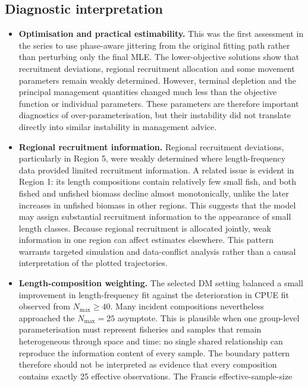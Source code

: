 \documentclass[
  english,
  a4paper,
  a4paper,
  11pt]{SCreport}
\begin{document}
\subsection{Diagnostic interpretation}\label{diagnostic-interpretation}

\begin{itemize}
\item
  \textbf{Optimisation and practical estimability.} This was the first
  assessment in the series to use phase-aware jittering from the
  original fitting path rather than perturbing only the final MLE. The
  lower-objective solutions show that recruitment deviations, regional
  recruitment allocation and some movement parameters remain weakly
  determined. However, terminal depletion and the principal management
  quantities changed much less than the objective function or individual
  parameters. These parameters are therefore important diagnostics of
  over-parameterisation, but their instability did not translate
  directly into similar instability in management advice.
\item
  \textbf{Regional recruitment information.} Regional recruitment
  deviations, particularly in Region 5, were weakly determined where
  length-frequency data provided limited recruitment information. A
  related issue is evident in Region 1: its length compositions contain
  relatively few small fish, and both fished and unfished biomass
  decline almost monotonically, unlike the later increases in unfished
  biomass in other regions. This suggests that the model may assign
  substantial recruitment information to the appearance of small length
  classes. Because regional recruitment is allocated jointly, weak
  information in one region can affect estimates elsewhere. This pattern
  warrants targeted simulation and data-conflict analysis rather than a
  causal interpretation of the plotted trajectories.
\item
  \textbf{Length-composition weighting.} The selected DM setting
  balanced a small improvement in length-frequency fit against the
  deterioration in CPUE fit observed from \(N_{\max}\geq40\). Many
  incident compositions nevertheless approached the \(N_{\max}=25\)
  asymptote. This is plausible when one group-level parameterisation
  must represent fisheries and samples that remain heterogeneous through
  space and time: no single shared relationship can reproduce the
  information content of every sample. The boundary pattern therefore
  should not be interpreted as evidence that every composition contains
  exactly 25 effective observations. The Francis effective-sample-size

\end{itemize}
\end{document}
